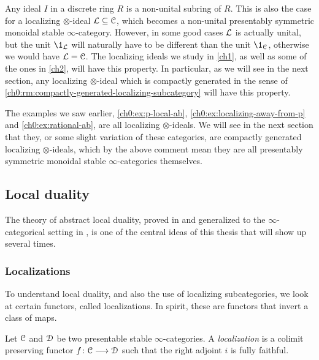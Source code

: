 Any ideal $I$ in a discrete ring $R$ is a non-unital subring of $R$. This is also the case for a localizing $\otimes$-ideal $\mathcal{L}\subseteq \EuScript{C}$, which becomes a non-unital presentably symmetric monoidal stable $\infty$-category. However, in some good cases $\mathcal{L}$ is actually unital, but the unit $\1_\L$ will naturally have to be different than the unit $\1_\C$, otherwise we would have $\mathcal{L}=\EuScript{C}$. The localizing ideals we study in \cref{ch1}, as well as some of the ones in \cref{ch2}, will have this property. In particular, as we will see in the next section, any localizing $\otimes$-ideal which is compactly generated in the sense of \cref{ch0:rm:compactly-generated-localizing-subcategory} will have this property.

\begin{example}
    The examples we saw earlier, \cref{ch0:ex:p-local-ab}, \cref{ch0:ex:localizing-away-from-p} and \cref{ch0:ex:rational-ab}, are all localizing $\otimes$-ideals. We will see in the next section that they, or some slight variation of these categories, are compactly generated localizing $\otimes$-ideals, which by the above comment mean they are all presentably symmetric monoidal stable $\infty$-categories themselves. 
\end{example}





\subsection{Local duality}
\label{ch0:ssec:local-duality}

The theory of abstract local duality, proved in \cite{hovey-palmiery-strickland_97} and generalized to the $\infty$-categorical setting in \cite{barthel-heard-valenzuela_2018}, is one of the central ideas of this thesis that will show up several times. 

\subsubsection{Localizations}

To understand local duality, and also the use of localizing subcategories, we look at certain functors, called localizations. In spirit, these are functors that invert a class of maps. 

\begin{definition}
    \label{ch0:def:localization}
    Let $\EuScript{C}$ and $\EuScript{D}$ be two presentable stable $\infty$-categories. A \emph{localization} is a colimit preserving functor $f\colon \EuScript{C}\longrightarrow \EuScript{D}$ such that the right adjoint $i$ is fully faithful.  
\end{definition}

